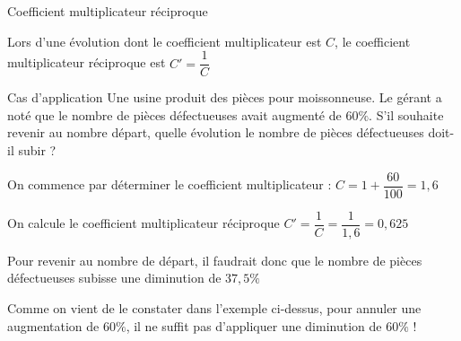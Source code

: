 \documentclass[oneside,12pt]{article}          %
\begin{document}
\begin{propriete}{Coefficient multiplicateur réciproque}
	\begin{minipage}{0.6\textwidth}
		Lors d'une évolution dont le coefficient multiplicateur est $C$, le coefficient multiplicateur réciproque est $C' = \dfrac{1}{C}$
	\end{minipage} \hspace{5mm}
	\begin{minipage}{0.3\textwidth}
	\end{minipage}
\end{propriete}

\begin{exemple}{Cas d'application}
	Une usine produit des pièces pour moissonneuse. Le gérant a noté que le nombre de pièces défectueuses avait augmenté de $60\%$. S'il souhaite revenir au nombre départ, quelle évolution le nombre de pièces défectueuses doit-il subir ?
	
	On commence par déterminer le coefficient multiplicateur : $C = 1 + \dfrac{60}{100} = 1,6$
	
	On calcule le coefficient multiplicateur réciproque $C' = \dfrac{1}{C} = \dfrac{1}{1,6} = 0,625$
	
	Pour revenir au nombre de départ, il faudrait donc que le nombre de pièces défectueuses subisse une diminution de $37,5\%$
\end{exemple}

\begin{remarque}
	Comme on vient de le constater dans l'exemple ci-dessus, pour annuler une augmentation de $60\%$, il ne suffit pas d'appliquer une diminution de $60\%$ !
\end{remarque}
\end{document}
